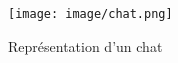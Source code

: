 \begin{figure}[ht]
	\centering
	\texttt{[image: image/chat.png]}
	\caption{Représentation d'un chat}
	\label{fig:chat1}
\end{figure}